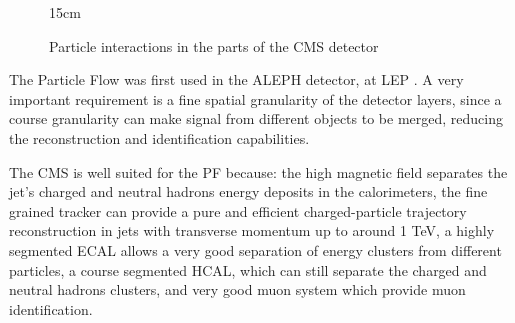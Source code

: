 \begin{figure}[!htm]{15cm}
\caption{Particle interactions in the parts of the CMS detector}%
\label{fig:pf_cms}
\end{figure}

The Particle Flow was first used in the ALEPH detector, at LEP \cite{ALEPH:1994ayc}. A very important requirement is a fine spatial granularity of the detector layers, since a course granularity can make signal from different objects to be merged, reducing the reconstruction and identification capabilities.

The CMS is well suited for the PF because: the high magnetic field separates the jet's charged and neutral hadrons energy deposits in the calorimeters, the fine grained tracker can provide a pure and efficient charged-particle trajectory reconstruction in jets with transverse momentum up to around 1 TeV, a highly segmented ECAL allows a very good separation of energy clusters from different particles, a course segmented HCAL, which can still separate the charged and neutral hadrons clusters, and very good muon system which provide muon identification.